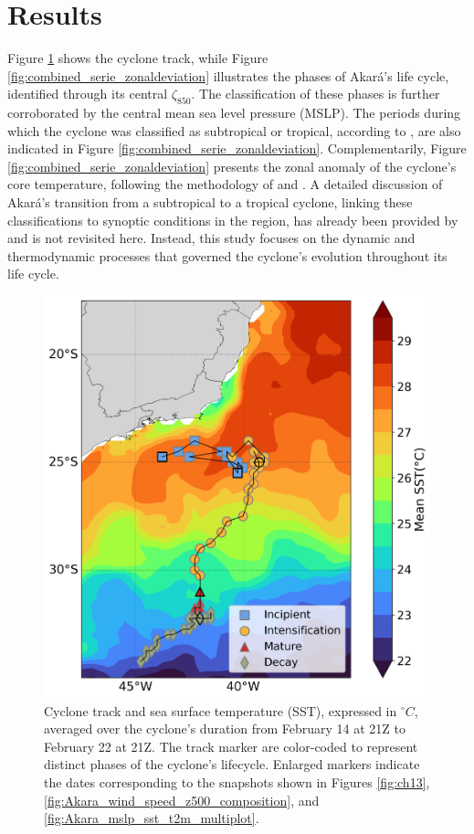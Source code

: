 \documentclass[pdflatex,sn-chicago]{sn-jnl}%
\theoremstyle{plain}
\theoremstyle{definition}
\theoremstyle{remark}
\theoremstyle{definition}
\begin{document}
\section{Results}

Figure \ref{fig:Akara_mean_sst_track} shows the cyclone track, while Figure \ref{fig:combined_serie_zonaldeviation} illustrates the phases of Akará's life cycle, identified through its central $\zeta_{850}$. The classification of these phases is further corroborated by the central mean sea level pressure (MSLP). The periods during which the cyclone was classified as subtropical or tropical, according to \citet{reboita2024assessment}, are also indicated in Figure \ref{fig:combined_serie_zonaldeviation}. Complementarily, Figure \ref{fig:combined_serie_zonaldeviation} presents the zonal anomaly of the cyclone's core temperature, following the methodology of \citet{reboita2021iba} and \citet{reboita2024assessment}. A detailed discussion of Akará's transition from a subtropical to a tropical cyclone, linking these classifications to synoptic conditions in the region, has already been provided by \citet{reboita2024assessment} and is not revisited here. Instead, this study focuses on the dynamic and thermodynamic processes that governed the cyclone's evolution throughout its life cycle.


\begin{figure}[h!]
\centering
\includegraphics[width=\textwidth]{Akara_mean_sst_track.png}
\caption{Cyclone track and sea surface temperature (SST), expressed in $^{\circ}C$, averaged over the cyclone's duration from February 14 at 21Z to February 22 at 21Z. The track marker are color-coded to represent distinct phases of the cyclone's lifecycle. Enlarged markers indicate the dates corresponding to the snapshots shown in Figures \ref{fig:ch13}, \ref{fig:Akara_wind_speed_z500_composition}, and \ref{fig:Akara_mslp_sst_t2m_multiplot}.}
\label{fig:Akara_mean_sst_track}
\end{figure}
\end{document}
